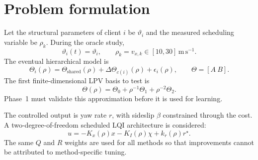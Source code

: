 \section{Problem formulation}
Let the structural parameters of client $i$ be $\vartheta_i$ and the measured
scheduling variable be $\rho_k$. During the oracle study,
\begin{equation}
  \vartheta_i(t)=\vartheta_i,\qquad \rho_k=v_{x,k}\in[10,30]\,\mathrm{m\,s^{-1}}.
\end{equation}
The eventual hierarchical model is
\begin{equation}
 \Theta_i(\rho)=\Theta_{\mathrm{shared}}(\rho)
 +\Delta\Theta_{c(i)}(\rho)+\epsilon_i(\rho),
 \qquad \Theta=[A\ B].
\end{equation}
The first finite-dimensional LPV basis to test is
\begin{equation}
 \Theta(\rho)=\Theta_0+\rho^{-1}\Theta_1+\rho^{-2}\Theta_2.
\end{equation}
Phase~1 must validate this approximation before it is used for learning.

The controlled output is yaw rate $r$, with sideslip $\beta$ constrained through
the cost. A two-degree-of-freedom scheduled LQI architecture is considered:
\begin{equation}
 u=-K_x(\rho)x-K_I(\rho)\chi+k_r(\rho)r^\star.
\end{equation}
The same $Q$ and $R$ weights are used for all methods so that improvements cannot
be attributed to method-specific tuning.
